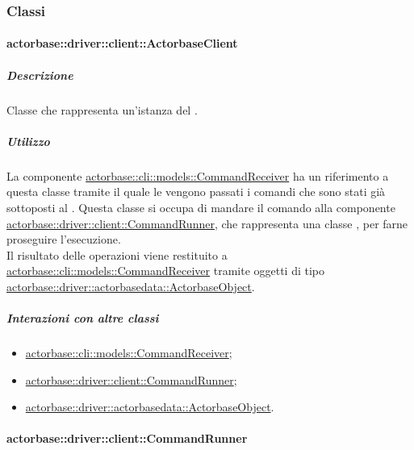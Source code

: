 \documentclass{scalatekids-article}
\begin{document}
\subsubsection{Classi}

\paragraph{actorbase::driver::client::ActorbaseClient}
\label{sec:actorbase::driver::client::ActorbaseClient}

\subparagraph{Descrizione}

Classe che rappresenta un'istanza del .

\subparagraph{Utilizzo}

La componente \hyperref[sec:actorbase::cli::models::CommandReceiver]{actorbase::cli::models::CommandReceiver}
ha un riferimento a questa classe tramite il quale le vengono passati
i comandi che sono stati già sottoposti al . Questa
classe si occupa di mandare il comando alla componente
\hyperref[sec:actorbase::driver::client::CommandRunner]{actorbase::driver::client::CommandRunner},
che rappresenta una classe , per farne proseguire l'esecuzione.\\
Il risultato delle operazioni viene restituito a \hyperref[sec:actorbase::cli::models::CommandReceiver]{actorbase::cli::models::CommandReceiver}
tramite oggetti di tipo \hyperref[sec:actorbase::driver::actorbasedata::ActorbaseObject]{actorbase::driver::actorbasedata::ActorbaseObject}.

\subparagraph{Interazioni con altre classi}

\begin{itemize}
\item \hyperref[sec:actorbase::cli::models::CommandReceiver]{actorbase::cli::models::CommandReceiver};
\item \hyperref[sec:actorbase::driver::client::CommandRunner]{actorbase::driver::client::CommandRunner};
\item \hyperref[sec:actorbase::driver::actorbasedata::ActorbaseObject]{actorbase::driver::actorbasedata::ActorbaseObject}.
\end{itemize}

\paragraph{actorbase::driver::client::CommandRunner}
\label{sec:actorbase::driver::client::CommandRunner}
\end{document}
